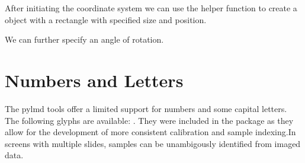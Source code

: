 \documentclass[letterpaper,10pt,english,openany,oneside]{sphinxmanual}
\begin{document}
\sphinxAtStartPar
After initiating the coordinate system we can use the {\hyperref[\detokenize{pages/modules:lmd.tools.rectangle}]{}} helper function to create a {\hyperref[\detokenize{pages/modules:lmd.lib.Shape}]{}} object with a rectangle with specified size and position.

\begin{sphinxVerbatim}[commandchars=\\\{\}]
    
  
\end{sphinxVerbatim}

\noindent{}

\sphinxAtStartPar
We can further specify an angle of rotation.

\begin{sphinxVerbatim}[commandchars=\\\{\}]
       
  
\end{sphinxVerbatim}

\noindent{}


\section{Numbers and Letters}
\label{\detokenize{pages/quickstart:numbers-and-letters}}
\sphinxAtStartPar
The py\sphinxhyphen{}lmd tools offer a limited support for numbers and some capital letters. The following glyphs are available: . They were included in the package as they allow for the development of more consistent calibration and sample indexing.In screens with multiple slides, samples can be unambigously identified from imaged data.
\end{document}
